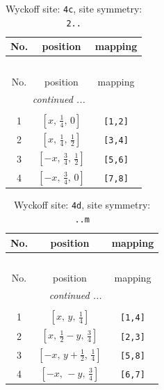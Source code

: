 \documentclass[fleqn,8pt]{jsarticle}
\begin{document}
\renewcommand{\arraystretch}{1.2}
\begin{longtable}{ccc}
\caption{Wyckoff site: {\tt 4c}, site symmetry: {\tt 2..}}
 \\
 \hline \hline
No. & position & mapping \\ \hline \endfirsthead

\multicolumn{2}{l}{\tablename\ \thetable{}} \\
 \hline \hline
No. & position & mapping \\ \hline \endhead

 \hline \hline
\multicolumn{2}{r}{\footnotesize\it continued ...} \\ \endfoot

 \hline \hline
\multicolumn{2}{r}{} \\ \endlastfoot

1 & $\left[ x,\, \frac{1}{4},\, 0 \right]$ & {\tt [1,2]} \\ \hline
2 & $\left[ x,\, \frac{1}{4},\, \frac{1}{2} \right]$ & {\tt [3,4]} \\ \hline
3 & $\left[ - x,\, \frac{3}{4},\, \frac{1}{2} \right]$ & {\tt [5,6]} \\ \hline
4 & $\left[ - x,\, \frac{3}{4},\, 0 \right]$ & {\tt [7,8]} \\
\end{longtable}
\renewcommand{\arraystretch}{1.2}
\begin{longtable}{ccc}
\caption{Wyckoff site: {\tt 4d}, site symmetry: {\tt ..m}}
 \\
 \hline \hline
No. & position & mapping \\ \hline \endfirsthead

\multicolumn{2}{l}{\tablename\ \thetable{}} \\
 \hline \hline
No. & position & mapping \\ \hline \endhead

 \hline \hline
\multicolumn{2}{r}{\footnotesize\it continued ...} \\ \endfoot

 \hline \hline
\multicolumn{2}{r}{} \\ \endlastfoot

1 & $\left[ x,\, y,\, \frac{1}{4} \right]$ & {\tt [1,4]} \\ \hline
2 & $\left[ x,\, \frac{1}{2} - y,\, \frac{3}{4} \right]$ & {\tt [2,3]} \\ \hline
3 & $\left[ - x,\, y + \frac{1}{2},\, \frac{1}{4} \right]$ & {\tt [5,8]} \\ \hline
4 & $\left[ - x,\, - y,\, \frac{3}{4} \right]$ & {\tt [6,7]} \\
\end{longtable}
\end{document}
